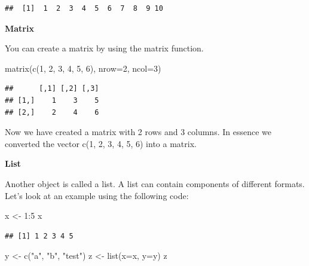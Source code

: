 \documentclass[
]{book}
\newenvironment{Shaded}{\begin{snugshade}}{\end{snugshade}}
\newcommand{\AttributeTok}[1]{\textcolor[rgb]{0.77,0.63,0.00}{#1}}
\newcommand{\DecValTok}[1]{\textcolor[rgb]{0.00,0.00,0.81}{#1}}
\newcommand{\FunctionTok}[1]{\textcolor[rgb]{0.00,0.00,0.00}{#1}}
\newcommand{\NormalTok}[1]{#1}
\newcommand{\OtherTok}[1]{\textcolor[rgb]{0.56,0.35,0.01}{#1}}
\newcommand{\SpecialCharTok}[1]{\textcolor[rgb]{0.00,0.00,0.00}{#1}}
\newcommand{\StringTok}[1]{\textcolor[rgb]{0.31,0.60,0.02}{#1}}
\begin{document}
\begin{verbatim}
##  [1]  1  2  3  4  5  6  7  8  9 10
\end{verbatim}

\textbf{Matrix}

You can create a matrix by using the matrix function.

\begin{Shaded}
\begin{Highlighting}[]
\FunctionTok{matrix}\NormalTok{(}\FunctionTok{c}\NormalTok{(}\DecValTok{1}\NormalTok{, }\DecValTok{2}\NormalTok{, }\DecValTok{3}\NormalTok{, }\DecValTok{4}\NormalTok{, }\DecValTok{5}\NormalTok{, }\DecValTok{6}\NormalTok{), }\AttributeTok{nrow=}\DecValTok{2}\NormalTok{, }\AttributeTok{ncol=}\DecValTok{3}\NormalTok{)}
\end{Highlighting}
\end{Shaded}

\begin{verbatim}
##      [,1] [,2] [,3]
## [1,]    1    3    5
## [2,]    2    4    6
\end{verbatim}

Now we have created a matrix with 2 rows and 3 columns. In essence we converted the vector c(1, 2, 3, 4, 5, 6) into a matrix.

\textbf{List}

Another object is called a list. A list can contain components of different formats. Let's look at an example using the following code:

\begin{Shaded}
\begin{Highlighting}[]
\NormalTok{x }\OtherTok{\textless{}{-}} \DecValTok{1}\SpecialCharTok{:}\DecValTok{5}
\NormalTok{x}
\end{Highlighting}
\end{Shaded}

\begin{verbatim}
## [1] 1 2 3 4 5
\end{verbatim}

\begin{Shaded}
\begin{Highlighting}[]
\NormalTok{y }\OtherTok{\textless{}{-}} \FunctionTok{c}\NormalTok{(}\StringTok{"a"}\NormalTok{, }\StringTok{"b"}\NormalTok{, }\StringTok{"test"}\NormalTok{)}
\NormalTok{z }\OtherTok{\textless{}{-}} \FunctionTok{list}\NormalTok{(}\AttributeTok{x=}\NormalTok{x, }\AttributeTok{y=}\NormalTok{y)}
\NormalTok{z}
\end{Highlighting}
\end{Shaded}
\end{document}
